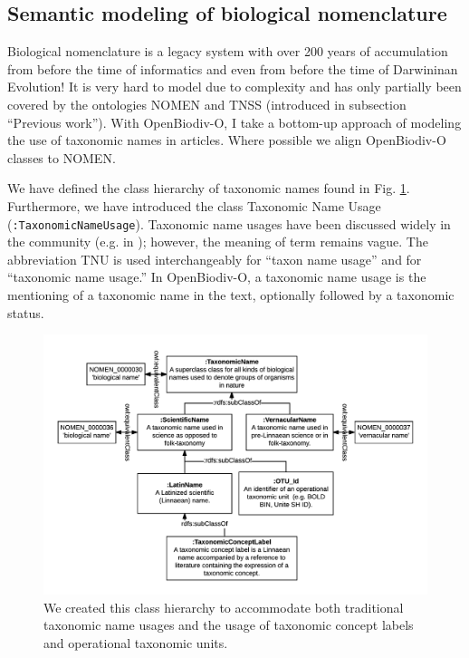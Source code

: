 \subsection{Semantic modeling of biological nomenclature}

Biological nomenclature is a legacy system with over 200 years of accumulation from before the time of informatics and even from before the time of Darwininan Evolution! It is very hard to model due to complexity and has only partially been covered by the ontologies NOMEN and TNSS (introduced in subsection ``Previous work''). With OpenBiodiv-O, I take a bottom-up approach of modeling the use of taxonomic names in articles. Where possible we align OpenBiodiv-O classes to NOMEN.

We have defined the class hierarchy of taxonomic names found in Fig. \ref{taxonomic-name-class-hierarchy-diagram}. Furthermore, we have introduced the class Taxonomic Name Usage ({\tt :TaxonomicNameUsage}). Taxonomic name usages have been discussed widely in the community (e.g. in \cite{pyle_taxonomic_2016}); however, the meaning of term remains vague. The abbreviation TNU is used interchangeably for ``taxon name usage'' and for ``taxonomic name usage.'' In OpenBiodiv-O, a taxonomic name usage is the mentioning of a taxonomic name in the text, optionally followed by a taxonomic status.

\begin{figure}[h!]
  \centering
  \includegraphics[width=\textwidth]{Figures/taxonomic-name-class-hierarchy-diagram}
  \decoRule
  \caption[Taxonomic name class hierarchy diagram.]{We created this class hierarchy to accommodate both traditional taxonomic name usages and the usage of taxonomic concept labels and operational taxonomic units.}
  \label{taxonomic-name-class-hierarchy-diagram}
\end{figure}

